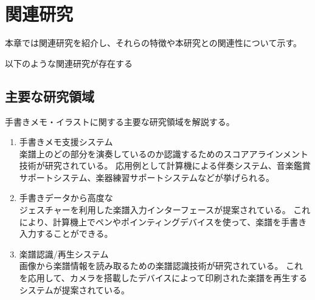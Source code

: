 \chapter{関連研究}
\label{chap:kanren}

本章では関連研究を紹介し、それらの特徴や本研究との関連性について示す。

\newpage

以下のような関連研究が存在する

\section{主要な研究領域}
手書きメモ・イラストに関する主要な研究領域を解説する。

\begin{enumerate}
    \item 手書きメモ支援システム\\
    楽譜上のどの部分を演奏しているのか認識するためのスコアアラインメント技術が研究されている\cite{online}\cite{learning}\cite{coupled}\cite{automatic}。
    応用例として計算機による伴奏システム\cite{muens}\cite{mysong}、音楽鑑賞サポートシステム\cite{orchestra}、楽器練習サポートシステムなどが挙げられる\cite{tutor}。
    \item 手書きデータから高度な\\
    ジェスチャーを利用した楽譜入力インターフェースが提案されている\cite{notepad}\cite{pen}\cite{sssp}。
    これにより、計算機上でペンやポインティングデバイスを使って、楽譜を手書き入力することができる。
    \item 楽譜認識/再生システム\\
    画像から楽譜情報を読み取るための楽譜認識技術が研究されている\cite{optical}\cite{early}\cite{symbol}。
    これを応用して、カメラを搭載したデバイスによって印刷された楽譜を再生するシステムが提案されている\cite{onnote}\cite{gocen}。
\end{enumerate}